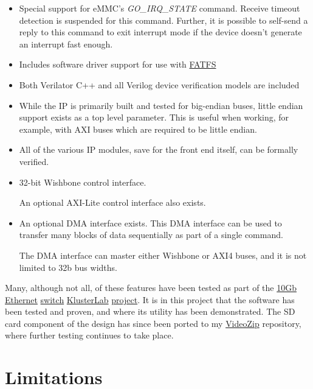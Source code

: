 \documentclass{gqtekspec}
\newcommand{\zhref}[2]{\href{#1}{\textcolor{dkblue}{#2}}}
\begin{document}
\begin{itemize}
\item Special support for eMMC's {\em GO\_IRQ\_STATE} command.  Receive timeout
	detection is suspended for this command.  Further, it is possible to
	self-send a reply to this command to exit interrupt mode if the device
	doesn't generate an interrupt fast enough.

\item Includes software driver support for use with 
	\zhref{http://elm-chan.org/fsw/ff/}{FATFS}

\item Both Verilator C++ and all Verilog device verification models are
	included

\item While the IP is primarily built and tested for big-endian buses,
	little endian support exists as a top level parameter.  This is useful
	when working, for example, with AXI buses which are required to be
	little endian.

\item All of the various IP modules, save for the front end itself, can be
	formally verified.

\item 32-bit Wishbone control interface.

	An optional AXI-Lite control interface also exists.

\item An optional DMA interface exists.  This DMA interface can be used to
	transfer many blocks of data sequentially as part of a single command.

	The DMA interface can master either Wishbone or AXI4 buses, and it is
	not limited to 32b bus widths.
\end{itemize}

Many, although not all, of these features have been tested as part of the
\zhref{https://github.com/ZipCPU/eth10g}{10Gb Ethernet}
\zhref{https://github.com/ZipCPU/eth10g}{switch}
\zhref{https://github.com/ZipCPU/eth10g}{KlusterLab}
\zhref{https://github.com/ZipCPU/eth10g}{project}.
It is in this project that the software has been tested and proven,
and where its utility has been demonstrated.  The SD card component of the
design has since been ported to my
\zhref{https://github.com/ZipCPU/videozip}{VideoZip} repository, where further
testing continues to take place.

\section{Limitations}
\end{document}
